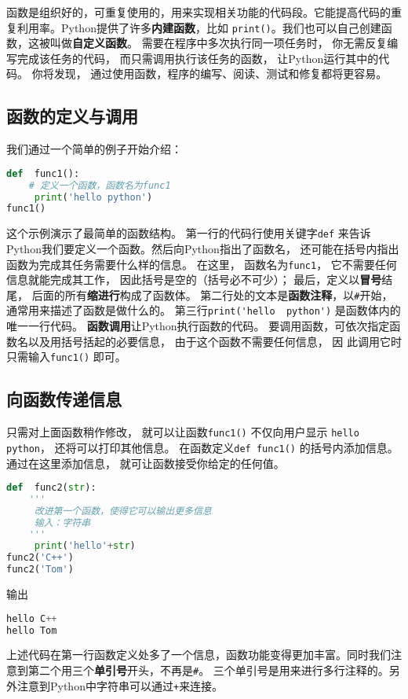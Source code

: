 

函数是组织好的，可重复使用的，用来实现相关功能的代码段。它能提高代码的重复利用率。Python提供了许多\textbf{内建函数}，比如 \verb|print()|。我们也可以自己创建函数，这被叫做\textbf{自定义函数}。 需要在程序中多次执行同一项任务时， 你无需反复编写完成该任务的代码， 而只需调用执行该任务的函数， 让Python运行其中的代码。 你将发现， 通过使用函数，程序的编写、阅读、测试和修复都将更容易。

\subsection{函数的定义与调用}
我们通过一个简单的例子开始介绍：
\begin{lstlisting}[language=python]
def  func1():
    # 定义一个函数，函数名为func1
     print('hello python')
func1()
\end{lstlisting}
这个示例演示了最简单的函数结构。 第一行的代码行使用关键字\verb|def| 来告诉Python我们要定义一个函数。然后向Python指出了函数名， 还可能在括号内指出函数为完成其任务需要什么样的信息。 在这里， 函数名为\verb|func1|， 它不需要任何信息就能完成其工作， 因此括号是空的（括号必不可少）； 最后，定义以\textbf{冒号}结尾， 后面的所有\textbf{缩进行}构成了函数体。 第二行处的文本是\textbf{函数注释}，以\verb|#|开始，通常用来描述了函数是做什么的。
第三行\verb|print('hello  python')| 是函数体内的唯一一行代码。
\textbf{函数调用}让Python执行函数的代码。 要调用函数，可依次指定函数名以及用括号括起的必要信息， 由于这个函数不需要任何信息， 因
此调用它时只需输入\verb|func1()| 即可。

\subsection{向函数传递信息}
只需对上面函数稍作修改， 就可以让函数\verb|func1()| 不仅向用户显示 \verb|hello python|， 还将可以打印其他信息。 在函数定义\verb|def func1()| 的括号内添加信息。 通过在这里添加信息， 就可让函数接受你给定的任何值。
\begin{lstlisting}[language=python]
def  func2(str):
    '''
     改进第一个函数，使得它可以输出更多信息
     输入：字符串
    '''
     print('hello'+str)
func2('C++')
func2('Tom')
\end{lstlisting}
输出
\begin{lstlisting}[language=python]
hello C++
hello Tom
\end{lstlisting}
上述代码在第一行函数定义处多了一个信息，函数功能变得更加丰富。同时我们注意到第二个用三个\textbf{单引号}开头，不再是\verb|#|。 三个单引号是用来进行多行注释的。另外注意到Python中字符串可以通过\verb|+|来连接。

